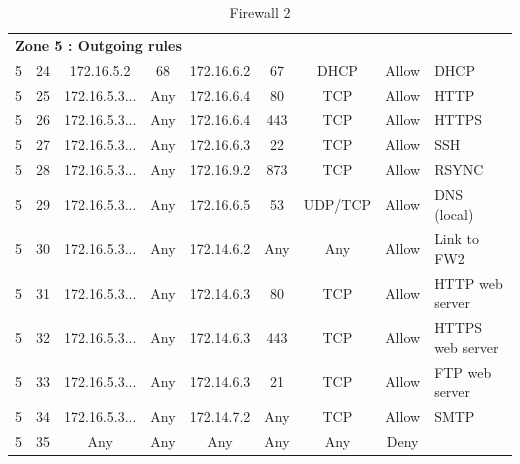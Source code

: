 \documentclass[a4paper,titlepage]{article}
\begin{document}
\begin{table}[h]
\begin{tabular}{c|c|cc|cc|ccl}
		\hline
		\multicolumn{9}{l}{\textbf{Zone 5 : Outgoing rules}}\\
		5 & 24 & 172.16.5.2 & 68 & 172.16.6.2 & 67 & DHCP & Allow & DHCP\\
		5 & 25 & 172.16.5.3... & Any & 172.16.6.4 & 80 & TCP & Allow & HTTP \\
		5 & 26 & 172.16.5.3... & Any & 172.16.6.4 & 443 & TCP & Allow & HTTPS \\
		5 & 27 & 172.16.5.3... & Any & 172.16.6.3 & 22 & TCP & Allow & SSH \\
		5 & 28 & 172.16.5.3... & Any & 172.16.9.2 & 873 & TCP & Allow & RSYNC \\
		5 & 29 & 172.16.5.3... & Any & 172.16.6.5 & 53 & UDP/TCP & Allow & DNS (local) \\
		5 & 30 & 172.16.5.3... & Any & 172.14.6.2 & Any & Any & Allow & Link to FW2 \\
		5 & 31 & 172.16.5.3... & Any & 172.14.6.3 & 80 & TCP & Allow & HTTP web server \\
		5 & 32 & 172.16.5.3... & Any & 172.14.6.3 & 443 & TCP & Allow & HTTPS web server \\
		5 & 33 & 172.16.5.3... & Any & 172.14.6.3 & 21 & TCP & Allow & FTP web server \\
		5 & 34 & 172.16.5.3... & Any & 172.14.7.2 & Any & TCP & Allow & SMTP \\
		5 & 35 & Any & Any & Any & Any & Any & Deny & \\


	\end{tabular}
	\caption{Firewall 2}
\end{table}


\end{document}
